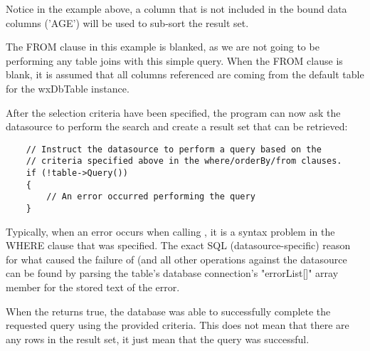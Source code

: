 Notice in the example above, a column that is not included in the bound 
data columns ('AGE') will be used to sub-sort the result set. 

The FROM clause in this example is blanked, as we are not going to be 
performing any table joins with this simple query. When the FROM clause 
is blank, it is assumed that all columns referenced are coming from 
the default table for the wxDbTable instance.

After the selection criteria have been specified, the program can now 
ask the datasource to perform the search and create a result set that 
can be retrieved:

\begin{verbatim}
    // Instruct the datasource to perform a query based on the 
    // criteria specified above in the where/orderBy/from clauses.
    if (!table->Query())
    {
        // An error occurred performing the query
    }
\end{verbatim}

Typically, when an error occurs when calling , it is a 
syntax problem in the WHERE clause that was specified. The exact SQL 
(datasource-specific) reason for what caused the failure of  
(and all other operations against the datasource can be found by 
parsing the table's database connection's "errorList[]" array member for 
the stored text of the error.

When the  returns true, the 
database was able to successfully complete the requested query using the 
provided criteria. This does not mean that there are any rows in the 
result set, it just mean that the query was successful.


